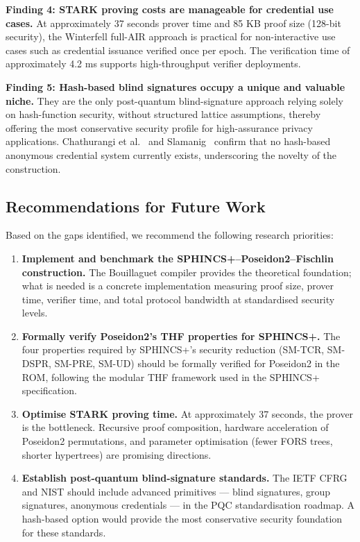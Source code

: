 \documentclass[11pt,a4paper]{article}
\newcommand{\ROM}{\textsf{ROM}}
\begin{document}
\medskip\noindent\textbf{Finding 4: STARK proving costs are manageable for credential use
cases.}  At approximately 37 seconds prover time and 85 KB proof size (128-bit security), the
Winterfell full-AIR approach is practical for non-interactive use cases such as credential
issuance verified once per epoch.  The verification time of approximately 4.2 ms supports
high-throughput verifier deployments.

\medskip\noindent\textbf{Finding 5: Hash-based blind signatures occupy a unique and valuable
niche.}  They are the only post-quantum blind-signature approach relying solely on
hash-function security, without structured lattice assumptions, thereby offering the most
conservative security profile for high-assurance privacy applications.
Chathurangi et al.~\cite{Chathurangi2025Advances} and Slamanig~\cite{Slamanig2025PrivacyAuth}
confirm that no hash-based anonymous credential system currently exists, underscoring the
novelty of the construction.

\subsection{Recommendations for Future Work}

Based on the gaps identified, we recommend the following research priorities:

\begin{enumerate}
  \item \textbf{Implement and benchmark the SPHINCS+--Poseidon2--Fischlin construction.}
        The Bouillaguet compiler \cite{Bouillaguet2026BlindingPH} provides the theoretical
        foundation; what is needed is a concrete implementation measuring proof size, prover
        time, verifier time, and total protocol bandwidth at standardised security levels.
  \item \textbf{Formally verify Poseidon2's THF properties for SPHINCS+.}
        The four properties required by SPHINCS+'s security reduction (SM-TCR, SM-DSPR, SM-PRE,
        SM-UD) should be formally verified for Poseidon2 in the \ROM, following the modular
        THF framework used in the SPHINCS+ specification.
  \item \textbf{Optimise STARK proving time.}  At approximately 37 seconds, the prover is the
        bottleneck.  Recursive proof composition, hardware acceleration of Poseidon2
        permutations, and parameter optimisation (fewer FORS trees, shorter hypertrees) are
        promising directions.
  \item \textbf{Establish post-quantum blind-signature standards.}  The IETF CFRG and NIST
        should include advanced primitives --- blind signatures, group signatures, anonymous
        credentials --- in the PQC standardisation roadmap.  A hash-based option would provide
        the most conservative security foundation for these standards.
\end{enumerate}
\end{document}
